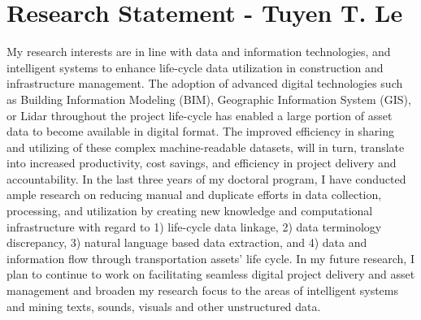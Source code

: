 \documentclass[a4paper,11pt]{article}
\begin{document}
\singlespacing
{}
\sectionfont{\centering}

\section*{\large Research Statement - Tuyen T. Le}
My research interests are in line with data and information technologies, and intelligent systems to enhance life-cycle data utilization in construction and infrastructure management. 
%
The adoption of advanced digital technologies such as Building Information Modeling (BIM), Geographic Information System (GIS), or Lidar throughout the project life-cycle has enabled a large portion of asset data to become available in digital format. 
%
The improved efficiency in sharing and utilizing of these complex machine-readable datasets, will in turn, translate into increased productivity, cost savings, and efficiency in project delivery and accountability.
%
%
In the last three years of my doctoral program, I have conducted ample research on reducing manual and duplicate efforts in data collection, processing, and utilization by creating new knowledge and computational infrastructure with regard to 1) life-cycle data linkage, 2) data terminology discrepancy, 3) natural language based data extraction, and 4) data and information flow through transportation assets' life cycle.
%
In my future research, I plan to continue to work on facilitating seamless digital project delivery and asset management and broaden my research focus to the areas of intelligent systems and mining texts, sounds, visuals and other unstructured data.
%


\end{document}
